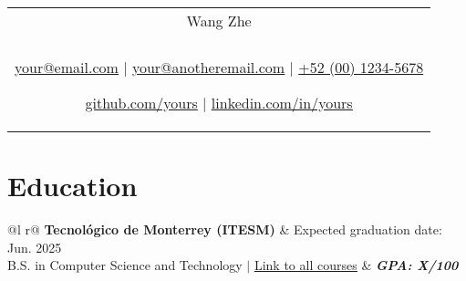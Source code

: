 \documentclass[a4paper,8pt]{article}
\begin{document}
\pagestyle{empty} 


\begin{tabularx}{\linewidth}{@{} C @{}}
\color[HTML]{1C033C} \Huge{Wang Zhe} \\[6pt]
\\
\textcolor[HTML]{371e77}{\underline{\href{mailto:your@email.com}{\raisebox{-0.05\height}{\faEnvelope} your@email.com}} $|$}
\textcolor[HTML]{371e77}{\underline{\href{mailto:your@anotheremail.com}{\raisebox{-0.05\height}{\faEnvelope} your@anotheremail.com}} $|$}
\textcolor[HTML]{371e77}{\href{tel:+525513219900}{\raisebox{-0.05\height}{\faMobile} +52 (00) 1234-5678}}

\textcolor[HTML]{371e77}{\underline{\href{https://github.com/yours}{\raisebox{-0.05\height}{\faGithub} github.com/yours}} $|$}
\textcolor[HTML]{371e77}{\underline{\href{https://linkedin.com/in/yours}{\raisebox{-0.05\height}{\faLinkedin} linkedin.com/in/yours}}}
\end{tabularx}

\section{Education}
\begin{tabularx}{\linewidth}{ @{}l r@{} }
\color[HTML]{1C033C} \textbf{Tecnológico de Monterrey (ITESM)} & \hfill \color[HTML]{371e77} Expected graduation date: Jun. 2025 \\
\color[HTML]{371e77} B.S. in Computer Science and Technology $|$ {\uline{\href{https://linktoyourcarrer.site}{Link to all courses}}} & \hfill \color[HTML]{4B28A4} \textit{\textbf{GPA: X/100}} \\
\end{tabularx}


\end{document}
